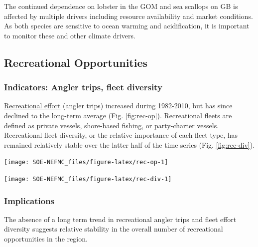 \documentclass[
  10pt,
]{article}
\let\origfigure\figure
\let\endorigfigure\endfigure
\renewenvironment{figure}[1][2] {
    \expandafter\origfigure\expandafter[H]
} {
    \endorigfigure
}
\begin{document}
The continued dependence on lobster in the GOM and sea scallops on GB is affected by multiple drivers including resource availability and market conditions. As both species are sensitive to ocean warming and acidification, it is important to monitor these and other climate drivers.

\hypertarget{recreational-opportunities}{%
\subsection{Recreational Opportunities}\label{recreational-opportunities}}

\hypertarget{indicators-angler-trips-fleet-diversity}{%
\subsubsection{Indicators: Angler trips, fleet diversity}\label{indicators-angler-trips-fleet-diversity}}

\href{https://noaa-edab.github.io/catalog/recdat.html}{Recreational effort} (angler trips) increased during 1982-2010, but has since declined to the long-term average (Fig. \ref{fig:rec-op}). Recreational fleets are defined as private vessels, shore-based fishing, or party-charter vessels. Recreational fleet diversity, or the relative importance of each fleet type, has remained relatively stable over the latter half of the time series (Fig. \ref{fig:rec-div}).

\begin{figure}

{\centering \texttt{[image: SOE-NEFMC\_files/figure-latex/rec-op-1]} 

}

\caption{Recreational effort in New England.}\label{fig:rec-op}
\end{figure}
\begin{figure}

{\centering \texttt{[image: SOE-NEFMC\_files/figure-latex/rec-div-1]} 

}

\caption{Recreational fleet effort diversity in New England.}\label{fig:rec-div}
\end{figure}

\hypertarget{implications-2}{%
\subsubsection{Implications}\label{implications-2}}

The absence of a long term trend in recreational angler trips and fleet effort diversity suggests relative stability in the overall number of recreational opportunities in the region.
\end{document}
